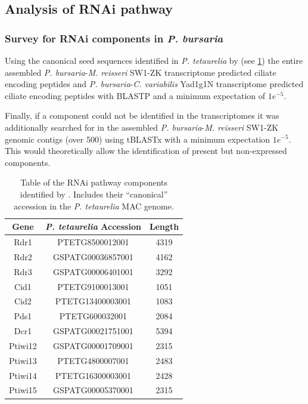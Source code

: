\subsection{Analysis of RNAi pathway}

\subsubsection{Survey for RNAi components in \textit{P. bursaria}}

Using the canonical seed sequences identified in \textit{P. tetaurelia}
by \citep{Marker2014} (see \cref{tab:rnai_seeds}) the entire assembled 
\textit{P. bursaria}-\textit{M. reisseri} SW1-ZK transcriptome predicted
ciliate encoding peptides and
\textit{P. bursaria}-\textit{C. variabilis} Yad1g1N transcriptome predicted 
ciliate encoding peptides with BLASTP and a minimum expectation
of \(1e^{-5}\).

Finally, if a component could not be identified in the transcriptomes
it was additionally searched for in the assembled \textit{P. bursaria}-\textit{M. reisseri} SW1-ZK
genomic contigs (over \SI{500}{\bp}) using tBLASTx with a minimum expectation \(1e^{-5}\).
This would theoretically allow the identification of present but non-expressed components.

\begin{table}
    \centering
    \begin{tabular}{|c|c|c|}
        \hline
        \textbf{Gene} & \textbf{\textit{P. tetaurelia} Accession} & \textbf{Length} \\
        \hline
        Rdr1 & PTETG8500012001 & 4319 \\ 
        Rdr2 & GSPATG00036857001 & 4162 \\
        Rdr3 & GSPATG00006401001 & 3292 \\
        Cid1 & PTETG9100013001 & 1051 \\
        Cid2 & PTETG13400003001 & 1083 \\
        Pds1 & PTETG600032001 & 2084 \\
        Dcr1 & GSPATG00021751001 & 5394 \\
        Ptiwi12 & GSPATG00001709001 & 2315 \\
        Ptiwi13 & PTETG4800007001 & 2483 \\
        Ptiwi14 & PTETG16300003001 & 2428 \\
        Ptiwi15 & GSPATG00005370001 & 2315 \\
        \hline
    \end{tabular}
    \caption[RNAi pathway components from \citep{Marker2014}]{Table of
    the RNAi pathway components identified by \citep{Marker2014}. 
    Includes their ``canonical'' accession in the \textit{P. tetaurelia}
MAC genome.}
    \label{tab:rnai_seeds}
\end{table}

